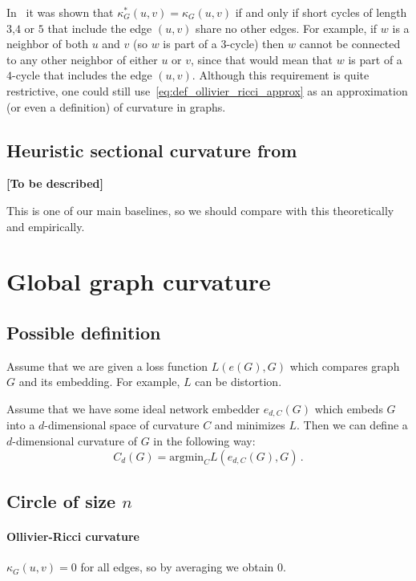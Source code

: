 \documentclass{article}
\begin{document}
In~\cite{kelly2019self} it was shown that $\kappa_G^\ast(u,v) = \kappa_G(u,v)$ if and only if short cycles of length $3$,$4$ or $5$ that include the edge $(u,v)$ share no other edges. For example, if $w$ is a neighbor of both $u$ and $v$ (so $w$ is part of a $3$-cycle) then $w$ cannot be connected to any other neighbor of either $u$ or $v$, since that would mean that $w$ is part of a $4$-cycle that includes the edge $(u,v)$. Although this requirement is quite restrictive, one could still use~\eqref{eq:def_ollivier_ricci_approx} as an approximation (or even a definition) of curvature in graphs.

\subsection{Heuristic sectional curvature from~\cite{gu2019learning}}

\textbf{[To be described]}

This is one of our main baselines, so we should compare with this theoretically and empirically.


\section{Global graph curvature}

\subsection{Possible definition}
        
Assume that we are given a loss function $L(e(G),G)$ which compares graph $G$ and its embedding. For example, $L$ can be distortion.

Assume that we have some ideal network embedder $e_{d,C}(G)$ which embeds $G$ into a $d$-dimensional space of curvature $C$ and minimizes $L$. Then we can define a $d$-dimensional curvature of $G$ in the following way:
\[
C_d(G) = \textrm{argmin}_C L(e_{d,C}(G),G)\,.
\]

\subsection{Circle of size $n$}
                     
\paragraph{Ollivier-Ricci curvature} $\kappa_G(u,v) = 0$ for all edges, so by averaging we obtain $0$.
\end{document}
